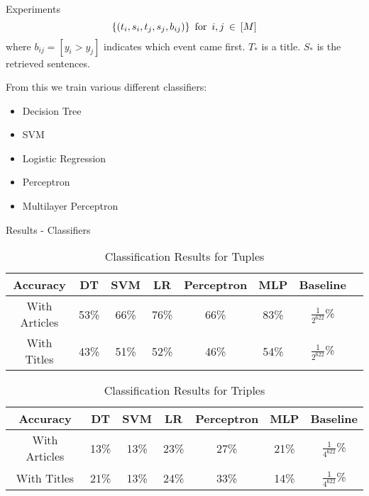 \documentclass{beamer}
\begin{document}
\begin{tframe}{Experiments}
  \begin{equation}
      \{(t_{i},s_{i},t_{j},s_{j},b_{ij})\} \hspace{0.5em} \text{for} \hspace{0.5em} i,j \hspace{0.2em}\in \hspace{0.2em}[M]\nonumber
    \end{equation}
  where $b_{ij} = [y_{i} > y_{j}]$ indicates which event came first.
  $T_*$ is a title.
  $S_*$ is the retrieved sentences.\vspace{1em}
  
  From this we train various different classifiers:
  \begin{itemize}
  \item Decision Tree
  \item SVM
  \item Logistic Regression
  \item Perceptron
  \item Multilayer Perceptron
    \end{itemize}
\end{tframe}


\begin{tframe}{Results - Classifiers}
\begin{table}[H]
\centering
\begin{tabular}{|c|c|c|c|c|c|c|c|}
  \hline
  Accuracy  & DT  & SVM & LR & Perceptron & MLP & Baseline\\
  \hline
  With Articles    & 53\%   & 66\% &  76\% & 66\% & 83\% & $\frac{1}{2^{622}}$\%\\
\hline
With Titles & 43\%  & 51\%    & 52\% & 46\% & 54\% & $\frac{1}{2^{622}}$\%\\
\hline
\end{tabular}
\caption{Classification Results for Tuples}
\label{table:classification-results}
\end{table}

\begin{table}[H]
\centering
\begin{tabular}{|c|c|c|c|c|c|c|}
  \hline
  Accuracy  & DT & SVM & LR & Perceptron & MLP & Baseline\\
  \hline
  With Articles & 13\%    & 13\% &  23\% & 27\% & 21\% &  $\frac{1}{4^{622}}$\%\\
\hline
With Titles & 21\% & 13\%    & 24\% & 33\% & 14\% &  $\frac{1}{4^{622}}$\%\\
\hline
\end{tabular}
\caption{Classification Results for Triples}
\label{table:triple-classification-results}
\end{table}
\end{tframe}
\end{document}
